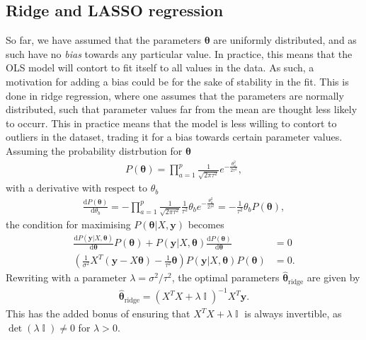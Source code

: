 \documentclass[twocolumn,english,notitlepage]{article}
\renewcommand{\d}[2][x]{\ensuremath{\frac{\mathrm{d}#2}{\mathrm{d}#1}}}
\renewcommand{\vec}[1]{\boldsymbol{#1}}
\newcommand{\pclosed}[1]{\left(#1\right)}
\renewcommand{\exp}[1]{e^{#1}}
\DeclareMathOperator{\eye}{\mathbb{I}}
\newcommand{\msub}[2]{\ensuremath{{#1}_\text{#2}}}
\begin{document}
        \subsection{Ridge and LASSO regression}
            So far, we have assumed that the parameters $\vec{\theta}$ are uniformly distributed, and as such have no \textit{bias} towards any particular value. In practice, this means that the OLS model will contort to fit itself to all values in the data. As such, a motivation for adding a bias could be for the sake of stability in the fit. This is done in ridge regression, where one assumes that the parameters are normally distributed, such that parameter values far from the mean are thought less likely to occurr. This in practice means that the model is less willing to contort to outliers in the dataset, trading it for a bias towards certain parameter values. Assuming the probability distrbution for $\vec{\theta}$
            \begin{align}
                P(\vec{\theta}) = \prod_{a=1}^{p} \frac{1}{\sqrt{2\pi\tau^2}} \exp{-\frac{\theta_a^2}{2\tau^2}},
            \end{align}
            with a derivative with respect to $\theta_b$
            \begin{align}
                \d[\theta_b]{P(\vec{\theta})} = -\prod_{a=1}^{p} \frac{1}{\sqrt{2\pi\tau^2}} \frac{1}{\tau^2} \theta_b \exp{-\frac{\theta_a^2}{2\tau^2}} = -\frac{1}{\tau^2} \theta_b P(\vec{\theta}),
            \end{align}
            the condition for maximising $P(\vec{\theta}|X, \vec{y})$ becomes
            \begin{align} \nonumber
                \d[\vec{\theta}]{P(\vec{y}|X, \vec{\theta})} P(\vec{\theta}) + P(\vec{y}|X, \vec{\theta}) \d[\vec{\theta}]{P(\vec{\theta})} &= 0 \\
                \pclosed{ \frac{1}{\sigma^2} X^T(\vec{y}-X\vec{\theta}) - \frac{1}{\tau^2} \vec{\theta} } P(\vec{y}|X,\vec{\theta}) P(\vec{\theta}) &= 0.
            \end{align}
            Rewriting with a parameter $\lambda = \sigma^2/\tau^2$, the optimal parameters $\msub{\vec{\hat{\theta}}}{ridge}$ are given by
            \begin{align}
                \boxed{
                \msub{\vec{\hat{\theta}}}{ridge} = \pclosed{X^TX + \lambda \eye}^{-1} X^T \vec{y}.
                }
            \end{align}
            This has the added bonus of ensuring that $X^TX + \lambda \eye$ is always invertible, as $\det(\lambda \eye) \neq 0$ for $\lambda>0$.
\end{document}
